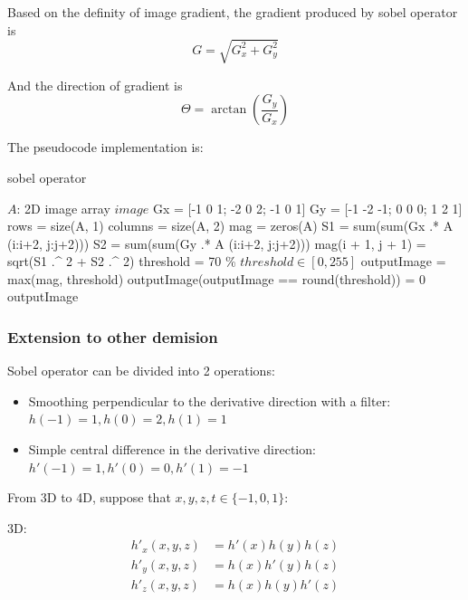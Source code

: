 \documentclass[10pt,twocolumn,letterpaper]{article}
\begin{document}
Based on the definity of image gradient, the gradient produced by sobel operator 
is 
$$
G = \sqrt{G_x^2 + G_y^2}
$$

And the direction of gradient is 
$$
\Theta = \arctan{\left( \frac{G_y}{G_x} \right)}
$$

The pseudocode implementation is: 

\begin{algorithm}
	\caption{sobel operator}
	\begin{algorithmic}[1]
		\Require $A$: 2D image array
		\Ensure $image$
			\State Gx = [-1 0 1; -2 0 2; -1 0 1] 
			\State Gy = [-1 -2 -1; 0 0 0; 1 2 1]
			\State
			\State rows = size(A, 1)
			\State columns = size(A, 2)
			\State mag = zeros(A)
			\State
				\For{each $j \in [1, columns - 2$}
					\State S1 = sum(sum(Gx .* A (i:i+2, j:j+2)))
					\State S2 = sum(sum(Gy .* A (i:i+2, j:j+2)))
					\State
					\State mag(i + 1, j + 1) = sqrt(S1 .\^{} 2 + S2 .\^{} 2)
				\EndFor
			\EndFor
			\State
			\State threshold = 70 \% $threshold \in [0, 255]$
			\State outputImage = max(mag, threshold)
			\State outputImage(outputImage == round(threshold)) = 0
			\State
			\State \Return outputImage
		\EndFunction
	\end{algorithmic}
\end{algorithm}

\subsubsection{Extension to other demision}

Sobel operator can be divided into 2 operations\cite{ref5}: 

\begin{itemize}[noitemsep]
\item Smoothing perpendicular to the derivative direction with a filter: 
$h(-1) = 1, h(0) = 2, h(1) = 1$
\item Simple central difference in the derivative direction: 
$h'(-1) = 1, h'(0) = 0, h'(1) = -1$
\end{itemize}

From 3D to 4D, suppose that $x, y, z, t \in \{-1, 0, 1\}$: 

3D: 
$$
\begin{aligned}
h'_x(x, y, z) & = h'(x)h(y)h(z) \\
h'_y(x, y, z) & = h(x)h'(y)h(z) \\
h'_z(x, y, z) & = h(x)h(y)h'(z) \\
\end{aligned}
$$
\end{document}
